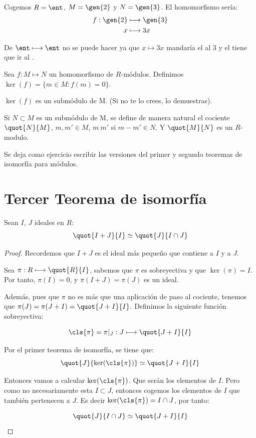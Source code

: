 \begin{example}
	Cogemos $R= \ent$, $M=\gen{2}$ y $N=\gen{3}$. El homomorfismo sería:
	\begin{align*}
		f: \gen{2} & \longmapsto  \gen{3}\\
		x & \longmapsto 3x \\
	\end{align*}
	

	\obs De $\ent \longmapsto \ent$ no se puede hacer ya que $x \longmapsto 3x$ mandaría el \one al 3 y el \one tiene que ir al \one.
\end{example}

\begin{defn}
	Sea $f:M \longmapsto N$ un homomorfismo de $R$-módulos. Definimos $\ker(f)=\{ m\in M:f(m)=0 \}$.
\end{defn}

\obs $\ker(f)$ es un submódulo de M. (Si no te lo crees, lo demuestras).

\begin{defn}
Si $N \subset M$ es un submódulo de M, se define de manera natural el cociente $\quot{N}{M}$, $m,m' \in M$, $m~m'$ si $m-m' \in N$. Y $\quot{M}{N}$ es un $R$-modulo.
\end{defn}

Se deja como ejercicio escribir las versiones del primer y segundo teoremas de isomorfía para módulos.

\section{Tercer Teorema de isomorfía}
\begin{theorem} \label{thm:IsomorfiaAnillos3}
	Sean $I$, $J$ ideales en $R$:
	$$ \quot{I+J}{I} \simeq \quot{J}{I \cap J} $$
\end{theorem}
\begin{proof}
	Recordemos que $I+J$ es el ideal más pequeño que contiene a $I$ y a $J$.


	Sea $\pi: R \longmapsto \quot{R}{I}$, sabemos que $\pi$ es sobreyectiva y que $\ker(\pi)=I$. Por tanto, $\pi(I)=0$, y $\pi(I+J)=\pi(J)$ es un ideal.

	Además, pues que $\pi$ no es más que una aplicación de paso al cociente, tenemos que $\pi(J)=\pi(J+I)=\quot{J+I}{I}$. Definimos la siguiente función sobreyectiva:

	$$ \cls{\pi}=\pi|_J: J \longmapsto \quot{J+I}{I}  $$

	Por el primer teorema de isomorfía, se tiene que:
	$$ \quot{J}{\ker(\cls{\pi})} \simeq \quot{J+I}{I} $$

	Entonces vamos a calcular $\ker(\cls{\pi})$. Que serán los elementos de $I$. Pero como no necesariamente esta $I\subset J$, entonces cogemos los elementos de $I$ que también pertenecen a $J$. Es decir $\ker(\cls{\pi})=I \cap J$, por tanto:

	$$ \quot{J}{I \cap J} \simeq \quot{J+I}{I} $$

\end{proof}


